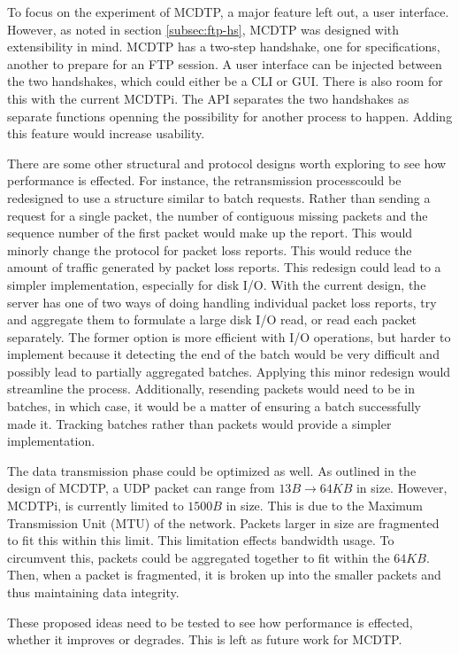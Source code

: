 To focus on the experiment of MCDTP, a major feature left out, a user interface. However, as noted in section \ref{subsec:ftp-hs}, MCDTP was designed with extensibility in mind. MCDTP has a two-step handshake, one for specifications, another to prepare for an FTP session. A user interface can be injected between the two handshakes, which could either be a CLI or GUI. There is also room for this with the current MCDTPi. The API separates the two handshakes as separate functions openning the possibility for another process to happen. Adding this feature would increase usability.

There are some other structural and protocol designs worth exploring to see how performance is effected. For instance, the retransmission processcould be redesigned to use a structure similar to batch requests. Rather than sending a request for a single packet, the number of contiguous missing packets and the sequence number of the first packet would make up the report. This would minorly change the protocol for packet loss reports. This would reduce the amount of traffic generated by packet loss reports. This redesign could lead to a simpler implementation, especially for disk I/O. With the current design, the server has one of two ways of doing handling individual packet loss reports, try and aggregate them to formulate a large disk I/O read, or read each packet separately. The former option is more efficient with I/O operations, but harder to implement because it detecting the end of the batch would be very difficult and possibly lead to partially aggregated batches. Applying this minor redesign would streamline the process. Additionally, resending packets would need to be in batches, in which case, it would be a matter of ensuring a batch successfully made it. Tracking batches rather than packets would provide a simpler implementation.

The data transmission phase could be optimized as well. As outlined in the design of MCDTP, a UDP packet can range from $13B \rightarrow 64KB$ in size. However, MCDTPi, is currently limited to $1500B$ in size. This is due to the Maximum Transmission Unit (MTU) of the network. Packets larger in size are fragmented to fit this within this limit. This limitation effects bandwidth usage. To circumvent this, packets could be aggregated together to fit within the $64KB$. Then, when a packet is fragmented, it is broken up into the smaller packets and thus maintaining data integrity.

These proposed ideas need to be tested to see how performance is effected, whether it improves or degrades. This is left as future work for MCDTP.